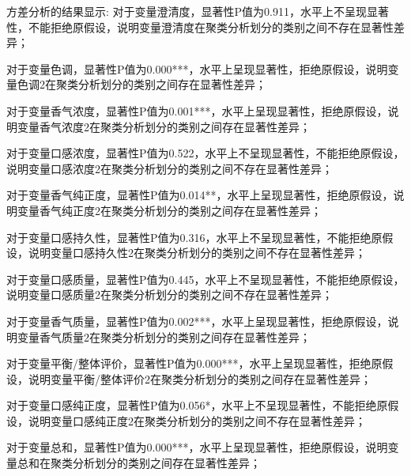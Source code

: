 \documentclass[UTF8]{ctexart}
\begin{document}
\begin{itemize}
\begin{itemize}
		            方差分析的结果显示:
		            对于变量澄清度，显著性P值为0.911，水平上不呈现显著性，不能拒绝原假设，说明变量澄清度在聚类分析划分的类别之间不存在显著性差异；

		            对于变量色调，显著性P值为0.000***，水平上呈现显著性，拒绝原假设，说明变量色调2在聚类分析划分的类别之间存在显著性差异；

		            对于变量香气浓度，显著性P值为0.001***，水平上呈现显著性，拒绝原假设，说明变量香气浓度2在聚类分析划分的类别之间存在显著性差异；

		            对于变量口感浓度，显著性P值为0.522，水平上不呈现显著性，不能拒绝原假设，说明变量口感浓度2在聚类分析划分的类别之间不存在显著性差异；

		            对于变量香气纯正度，显著性P值为0.014**，水平上呈现显著性，拒绝原假设，说明变量香气纯正度2在聚类分析划分的类别之间存在显著性差异；

		            对于变量口感持久性，显著性P值为0.316，水平上不呈现显著性，不能拒绝原假设，说明变量口感持久性2在聚类分析划分的类别之间不存在显著性差异；

		            对于变量口感质量，显著性P值为0.445，水平上不呈现显著性，不能拒绝原假设，说明变量口感质量2在聚类分析划分的类别之间不存在显著性差异；

		            对于变量香气质量，显著性P值为0.002***，水平上呈现显著性，拒绝原假设，说明变量香气质量2在聚类分析划分的类别之间存在显著性差异；

		            对于变量平衡/整体评价，显著性P值为0.000***，水平上呈现显著性，拒绝原假设，说明变量平衡/整体评价2在聚类分析划分的类别之间存在显著性差异；

		            对于变量口感纯正度，显著性P值为0.056*，水平上不呈现显著性，不能拒绝原假设，说明变量口感纯正度2在聚类分析划分的类别之间不存在显著性差异；

		            对于变量总和，显著性P值为0.000***，水平上呈现显著性，拒绝原假设，说明变量总和在聚类分析划分的类别之间存在显著性差异；
		            \begin{table}[!ht]
			            \centering


\end{table}
\end{itemize}
\end{itemize}
\end{document}
